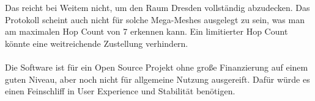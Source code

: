 \documentclass[12pt,a4paper]{article}
\begin{document}
Das reicht bei Weitem nicht, um den Raum Dresden vollständig abzudecken.
Das Protokoll scheint auch nicht für solche Mega-Meshes ausgelegt zu sein, was man am maximalen Hop Count von 7 erkennen kann. Ein limitierter Hop Count könnte eine weitreichende Zustellung verhindern.\\
\\
Die Software ist für ein Open Source Projekt ohne große Finanzierung auf einem guten Niveau, aber noch nicht für allgemeine Nutzung ausgereift. Dafür würde es einen Feinschliff in User Experience und Stabilität benötigen.\\
\end{document}
